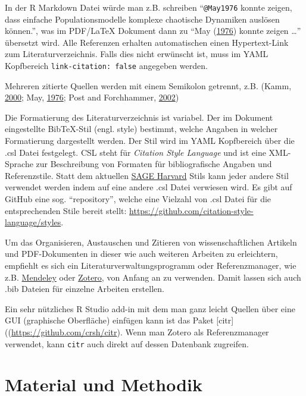 \documentclass[a4paper,12pt]{article}
\begin{document}
In der R Markdown Datei würde man z.B. schreiben \enquote{\texttt{@May1976} konnte zeigen, dass einfache Populationsmodelle komplexe chaotische Dynamiken auslösen können.}, was im PDF/LaTeX Dokument dann zu \enquote{May (\protect\hyperlink{ref-May1976}{1976}) konnte zeigen \ldots{}} übersetzt wird. Alle Referenzen erhalten automatischen einen Hypertext-Link zum Literaturverzeichnis. Falls dies nicht erwünscht ist, muss im YAML Kopfbereich \texttt{link-citation:\ false} angegeben werden.

Mehreren zitierte Quellen werden mit einem Semikolon getrennt, z.B. (Kamm, \protect\hyperlink{ref-kamm2000}{2000}; May, \protect\hyperlink{ref-May1976}{1976}; Post and Forchhammer, \protect\hyperlink{ref-RN410}{2002})

Die Formatierung des Literaturverzeichnis ist variabel. Der im Dokument eingestellte BibTeX-Stil (engl. style) bestimmt, welche Angaben in welcher Formatierung dargestellt werden. Der Stil wird im YAML Kopfbereich über die .csl Datei festgelegt. CSL steht für \emph{Citation Style Language} und ist eine XML-Sprache zur Beschreibung von Formaten für bibliografische Angaben und Referenzstile. Statt dem aktuellen \href{https://uk.sagepub.com/sites/default/files/sage_harvard_reference_style_0.pdf}{SAGE Harvard} Stils kann jeder andere Stil verwendet werden indem auf eine andere .csl Datei verwiesen wird. Es gibt auf GitHub eine sog. \enquote{repository}, welche eine Vielzahl von .csl Datei für die entsprechenden Stile bereit stellt: \url{https://github.com/citation-style-language/styles}.

Um das Organisieren, Austauschen und Zitieren von wissenschaftlichen Artikeln und PDF-Dokumenten in dieser wie auch weiteren Arbeiten zu erleichtern, empfiehlt es sich ein Literaturverwaltungsprogramm oder Referenzmanager, wie z.B. \href{https://www.mendeley.com/?interaction_required=true}{Mendeley} oder \href{https://www.zotero.org/}{Zotero}, von Anfang an zu verwenden. Damit lassen sich auch .bib Dateien für einzelne Arbeiten erstellen.

Ein sehr nützliches R Studio add-in mit dem man ganz leicht Quellen über eine GUI (graphische Oberfläche) einfügen kann ist das Paket {[}citr{]}((\url{https://github.com/crsh/citr}). Wenn man Zotero als Referenzmanager verwendet, kann \texttt{citr} auch direkt auf dessen Datenbank zugreifen.

\newpage

\hypertarget{material-und-methodik}{%
\section{Material und Methodik}\label{material-und-methodik}}
\end{document}
